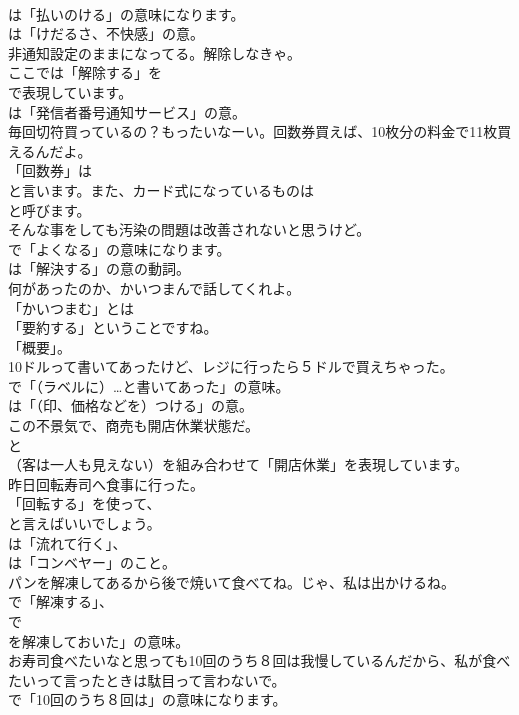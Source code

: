 \documentclass[8pt]{extreport}
\begin{document}
\begin{CJK}{UTF8}{min}
\\	は「払いのける」の意味になります。
\\	は「けだるさ、不快感」の意。	
\\	非通知設定のままになってる。解除しなきゃ。 
\\	ここでは「解除する」を 
\\	で表現しています。
\\	は「発信者番号通知サービス」の意。	
\\	毎回切符買っているの？もったいなーい。回数券買えば、10枚分の料金で11枚買えるんだよ。 
\\	「回数券」は
\\	と言います。また、カード式になっているものは
\\	と呼びます。	
\\	そんな事をしても汚染の問題は改善されないと思うけど。 
\\	で「よくなる」の意味になります。
\\	は「解決する」の意の動詞。	
\\	何があったのか、かいつまんで話してくれよ。 
\\	「かいつまむ」とは
\\	「要約する」ということですね。
\\	「概要」。	
\\	10ドルって書いてあったけど、レジに行ったら５ドルで買えちゃった。 
\\	で「（ラベルに）…と書いてあった」の意味。
\\	は「（印、価格などを）つける」の意。	
\\	この不景気で、商売も開店休業状態だ。 
\\	と 
\\	（客は一人も見えない）を組み合わせて「開店休業」を表現しています。	
\\	昨日回転寿司へ食事に行った。 
\\	「回転する」を使って、
\\	と言えばいいでしょう。
\\	は「流れて行く」、
\\	は「コンベヤー」のこと。	
\\	パンを解凍してあるから後で焼いて食べてね。じゃ、私は出かけるね。 
\\	で「解凍する」、
\\	で
\\	を解凍しておいた」の意味。	
\\	お寿司食べたいなと思っても10回のうち８回は我慢しているんだから、私が食べたいって言ったときは駄目って言わないで。 
\\	で「10回のうち８回は」の意味になります。	

\end{CJK}
\end{document}
